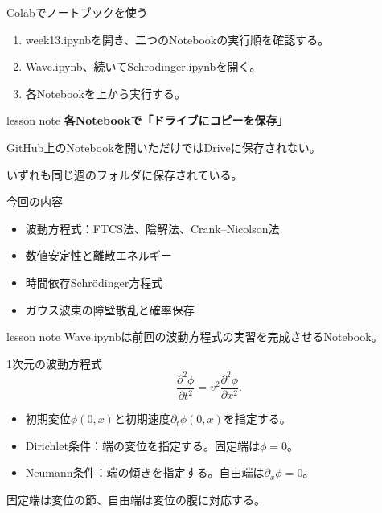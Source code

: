 \documentclass[12pt,aspectratio=43]{beamer}
\newcommand{\code}[1]{{\codefont #1}}
\newenvironment{lessonbox}
  {\begin{beamercolorbox}[wd=\linewidth,sep=1.5mm]{lesson note}}
  {\end{beamercolorbox}\par}
\begin{document}
\begin{frame}[t]{Colabでノートブックを使う}
  \begin{enumerate}
    \setlength{\itemsep}{3mm}
    \item \code{week13.ipynb}を開き、二つのNotebookの実行順を確認する。
    \item \code{Wave.ipynb}、続いて\code{Schrodinger.ipynb}を開く。
    \item 各Notebookを上から実行する。
  \end{enumerate}
  \vspace{3mm}
  \begin{lessonbox}
    \textbf{各Notebookで「ドライブにコピーを保存」}\par
    \small GitHub上のNotebookを開いただけではDriveに保存されない。
  \end{lessonbox}
  \vfill
  {\footnotesize いずれも同じ週のフォルダに保存されている。}
\end{frame}

\begin{frame}[t]{今回の内容}
  \begin{itemize}
    \setlength{\itemsep}{3mm}
    \item 波動方程式：FTCS法、陰解法、Crank--Nicolson法
    \item 数値安定性と離散エネルギー
    \item 時間依存Schrödinger方程式
    \item ガウス波束の障壁散乱と確率保存
  \end{itemize}
  \vfill
  \begin{lessonbox}
    \code{Wave.ipynb}は前回の波動方程式の実習を完成させるNotebook。
  \end{lessonbox}
\end{frame}

\begin{frame}[t]{1次元の波動方程式}
  \[
    \frac{\partial^2\phi}{\partial t^2}
    =v^2\frac{\partial^2\phi}{\partial x^2}.
  \]
  \begin{itemize}
    \item 初期変位\(\phi(0,x)\)と初期速度\(\partial_t\phi(0,x)\)を指定する。
    \item Dirichlet条件：端の変位を指定する。固定端は\(\phi=0\)。
    \item Neumann条件：端の傾きを指定する。自由端は\(\partial_x\phi=0\)。
  \end{itemize}
  \small 固定端は変位の節、自由端は変位の腹に対応する。
\end{frame}
\end{document}
